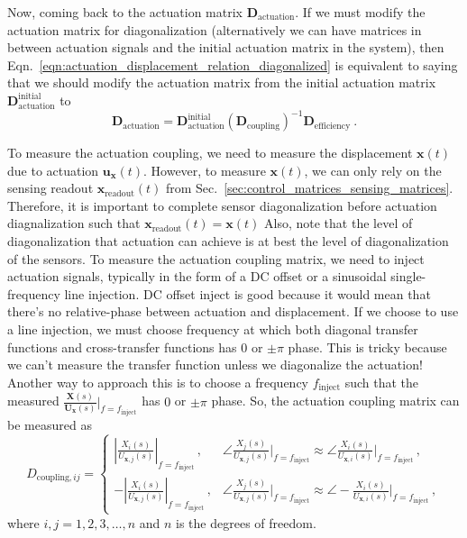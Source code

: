 Now, coming back to the actuation matrix $\mathbf{D}_\mathrm{actuation}$.
If we must modify the actuation matrix for diagonalization (alternatively we can have matrices in between actuation signals and the initial actuation matrix in the system), then Eqn.~\eqref{eqn:actuation_displacement_relation_diagonalized} is equivalent to saying that we should modify the actuation matrix from the initial actuation matrix $\mathbf{D}_\mathrm{actuation}^\mathrm{initial}$ to
\begin{equation}
	\boxed{
		\mathbf{D}_\mathrm{actuation} = \mathbf{D}_\mathrm{actuation}^\mathrm{initial} \left(\mathbf{D}_\mathrm{coupling}\right)^{-1} \mathbf{D}_\mathrm{efficiency}
	}\ .
	\label{eqn:actuation_matrix_diagonalized}
\end{equation}

To measure the actuation coupling, we need to measure the displacement $\mathbf{x}(t)$ due to actuation $\mathbf{u}_\mathbf{x}(t)$.
However, to measure $\mathbf{x}(t)$, we can only rely on the sensing readout $\mathbf{x}_\mathrm{readout}(t)$ from Sec.~\ref{sec:control_matrices_sensing_matrices}.
Therefore, it is important to complete sensor diagonalization before actuation diagnalization such that $\mathbf{x}_\mathrm{readout}(t)=\mathbf{x}(t)$
Also, note that the level of diagonalization that actuation can achieve is at best the level of diagonalization of the sensors.
To measure the actuation coupling matrix, we need to inject actuation signals, typically in the form of a DC offset or a sinusoidal single-frequency line injection.
DC offset inject is good because it would mean that there's no relative-phase between actuation and displacement.
If we choose to use a line injection, we must choose frequency at which both diagonal transfer functions and cross-transfer functions has $0$ or $\pm\pi$ phase.
This is tricky because we can't measure the transfer function unless we diagonalize the actuation!
Another way to approach this is to choose a frequency $f_\mathrm{inject}$ such that the measured $\frac{\mathbf{X}(s)}{\mathbf{U}_\mathbf{x}(s)}\big\rvert_{f=f_\mathrm{inject}}$ has $0$ or $\pm\pi$ phase.
So, the actuation coupling matrix can be measured as
\begin{equation}
	\boxed{
		D_{\mathrm{coupling}, ij} =
		\begin{cases}
			\left\lvert\frac{X_{i}(s)}{U_{\mathbf{x}, j}(s)}\right\rvert_{f=f_\mathrm{inject}}\,, & \angle\frac{X_{j}(s)}{U_{\mathbf{x}, j}(s)}\Big\rvert_{f=f_\mathrm{inject}} \approx \angle\frac{X_{i}(s)}{U_{\mathbf{x}, i}(s)}\Big\rvert_{f=f_\mathrm{inject}}\,,\\
			-\left\lvert\frac{X_{i}(s)}{U_{\mathbf{x}, j}(s)}\right\rvert_{f=f_\mathrm{inject}}\,, & \angle\frac{X_{j}(s)}{U_{\mathbf{x}, j}(s)}\Big\rvert_{f=f_\mathrm{inject}} \approx \angle -\frac{X_{i}(s)}{U_{\mathbf{x}, i}(s)}\Big\rvert_{f=f_\mathrm{inject}}\,,
		\end{cases}	
}
\end{equation}
where $i,j = 1,2,3,\dots,n$ and $n$ is the degrees of freedom.

